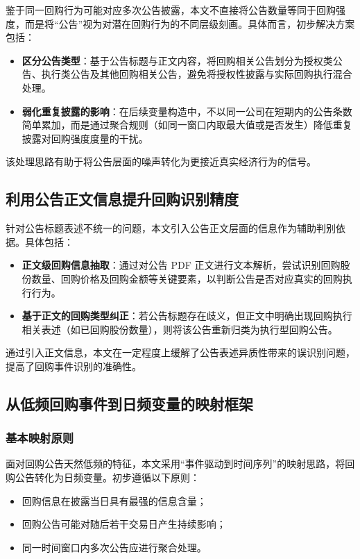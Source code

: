 \documentclass[a4paper,10pt]{article}
\begin{document}
鉴于同一回购行为可能对应多次公告披露，本文不直接将公告数量等同于回购强度，而是将“公告”视为对潜在回购行为的不同层级刻画。具体而言，初步解决方案包括：

\begin{itemize}
    \item \textbf{区分公告类型}：基于公告标题与正文内容，将回购相关公告划分为授权类公告、执行类公告及其他回购相关公告，避免将授权性披露与实际回购执行混合处理。
    \item \textbf{弱化重复披露的影响}：在后续变量构造中，不以同一公司在短期内的公告条数简单累加，而是通过聚合规则（如同一窗口内取最大值或是否发生）降低重复披露对回购强度度量的干扰。
\end{itemize}

该处理思路有助于将公告层面的噪声转化为更接近真实经济行为的信号。

\subsection{利用公告正文信息提升回购识别精度}

针对公告标题表述不统一的问题，本文引入公告正文层面的信息作为辅助判别依据。具体包括：

\begin{itemize}
    \item \textbf{正文级回购信息抽取}：通过对公告 PDF 正文进行文本解析，尝试识别回购股份数量、回购价格及回购金额等关键要素，以判断公告是否对应真实的回购执行行为。
    \item \textbf{基于正文的回购类型纠正}：若公告标题存在歧义，但正文中明确出现回购执行相关表述（如已回购股份数量），则将该公告重新归类为执行型回购公告。
\end{itemize}

通过引入正文信息，本文在一定程度上缓解了公告表述异质性带来的误识别问题，提高了回购事件识别的准确性。

\subsection{从低频回购事件到日频变量的映射框架}

\subsubsection{基本映射原则}

面对回购公告天然低频的特征，本文采用“事件驱动到时间序列”的映射思路，将回购公告转化为日频变量。初步遵循以下原则：

\begin{itemize}
    \item 回购信息在披露当日具有最强的信息含量；
    \item 回购公告可能对随后若干交易日产生持续影响；
    \item 同一时间窗口内多次公告应进行聚合处理。
\end{itemize}
\end{document}
